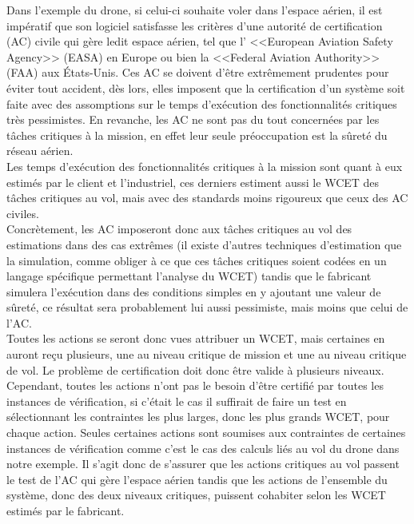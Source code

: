 \documentclass[a4paper]{report}
\theoremstyle{break}
\theoremstyle{breakplain}
\begin{document}
Dans l'exemple du drone, si celui-ci souhaite voler dans l'espace aérien, il est impératif que son logiciel satisfasse les critères d'une autorité de certification (AC) civile qui gère ledit espace aérien, tel que l’ <<European Aviation Safety Agency>> (EASA) en Europe ou bien la <<Federal Aviation Authority>> (FAA) aux États-Unis. Ces AC se doivent d'être extrêmement prudentes pour éviter tout accident, dès lors, elles imposent que la certification d'un système soit faite avec des assomptions sur le temps d'exécution des fonctionnalités critiques très pessimistes. En revanche, les AC ne sont pas du tout concernées par les tâches critiques à la mission, en effet leur seule préoccupation est la sûreté du réseau aérien.\\
Les temps d'exécution des fonctionnalités critiques à la mission sont quant à eux estimés par le client et l'industriel, ces derniers estiment aussi le WCET des tâches critiques au vol, mais avec des standards moins rigoureux que ceux des AC civiles.\\

Concrètement, les AC imposeront donc aux tâches critiques au vol des estimations dans des cas extrêmes (il existe d'autres techniques d'estimation que la simulation, comme obliger à ce que ces tâches critiques soient codées en un langage spécifique permettant l'analyse du WCET) tandis que le fabricant simulera l'exécution dans des conditions simples en y ajoutant une valeur de sûreté, ce résultat sera probablement lui aussi pessimiste, mais moins que celui de l'AC.\\

Toutes les actions se seront donc vues attribuer un WCET, mais certaines en auront reçu plusieurs, une au niveau critique de mission et une au niveau critique de vol. Le problème de certification doit donc être valide à plusieurs niveaux. Cependant, toutes les actions n'ont pas le besoin d'être certifié par toutes les instances de vérification, si c'était le cas il suffirait de faire un test en sélectionnant les contraintes les plus larges, donc les plus grands WCET, pour chaque action. Seules certaines actions sont soumises aux contraintes de certaines instances de vérification comme c'est le cas des calculs liés au vol du drone dans notre exemple. Il s'agit donc de s'assurer que les actions critiques au vol passent le test de l'AC qui gère l'espace aérien tandis que les actions de l'ensemble du système, donc des deux niveaux critiques, puissent cohabiter selon les WCET estimés par le fabricant.\\
\end{document}
